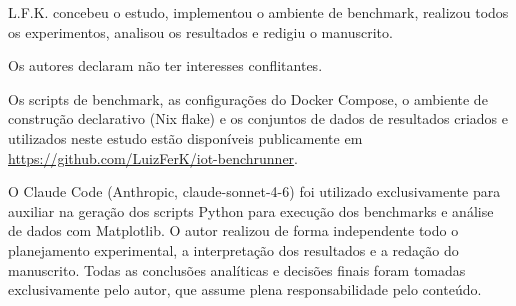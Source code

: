 \documentclass[brazilian]{presets/sbcreviews-2025}%
\begin{document}
\begin{declarations}

  \begin{contributions}
    L.F.K. concebeu o estudo, implementou o ambiente de benchmark, realizou todos os experimentos,
    analisou os resultados e redigiu o manuscrito.
  \end{contributions}

  \begin{interests}
    Os autores declaram não ter interesses conflitantes.
  \end{interests}

  \begin{materials}
    Os scripts de benchmark, as configurações do Docker Compose, o ambiente de construção declarativo
    (Nix flake) e os conjuntos de dados de resultados criados e utilizados neste estudo estão disponíveis publicamente em
    \url{https://github.com/LuizFerK/iot-benchrunner}.
  \end{materials}

  \begin{aitools}
    O Claude Code (Anthropic, claude-sonnet-4-6) foi utilizado exclusivamente para auxiliar na geração dos scripts Python para execução dos benchmarks e análise de dados com Matplotlib. O autor realizou de forma independente todo o planejamento experimental, a interpretação dos resultados e a redação do manuscrito. Todas as conclusões analíticas e decisões finais foram tomadas exclusivamente pelo autor, que assume plena responsabilidade pelo conteúdo.
  \end{aitools}

\end{declarations}



\end{document}
